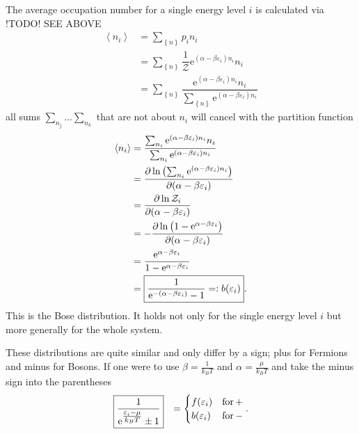 \documentclass[a4paper,10pt]{article}
\numberwithin{equation}{section}
\begin{document}
\begin{multicols}{2}
The average occupation number for a single energy level $i$ is calculated via !TODO! SEE ABOVE
\begin{align} 
  \left\langle n_i\right\rangle  &= \sum_{ \left\{n\right\}}^{}p_i n_i\\
                                 &= \sum_{ \left\{n\right\}}^{}\dfrac{1}{\mathcal{Z}}\text{e}^{(\alpha -\beta \varepsilon _i)n_i}n_i\\
                                 &= \sum_{ \left\{n\right\}}^{}\dfrac{\text{e}^{(\alpha -\beta \varepsilon _i)n_i}n_i}{\sum_{ \left\{n\right\}}^{}\text{e}^{(\alpha -\beta \varepsilon _i)n_i}}
\end{align} 
all sums $\sum_{n_j}^{}\hdots \sum_{n_k}^{}$ that are not about $n_i$ will cancel with the partition function
\begin{align} 
  \left\langle n_i\right\rangle  &= \dfrac{\sum_{n_i}^{}\text{e}^{(\alpha -\beta \varepsilon _i)n_i}n_i}{\sum_{n_i}^{}\text{e}^{(\alpha -\beta \varepsilon _i)n_i}}\\
                                 &= \diffp[]{\ln\left(\sum_{n_i}^{}\text{e}^{(\alpha -\beta \varepsilon _i)n_i}\right)}{(\alpha -\beta \varepsilon _i)}\\
                                 &= \diffp[]{\ln \mathcal{Z}_i}{(\alpha -\beta \varepsilon _i)}\\
                                 &= -\diffp[]{\ln \left(1-\text{e}^{\alpha -\beta \varepsilon _i}\right)}{(\alpha -\beta \varepsilon _i)}\\
                                 &= \dfrac{\text{e}^{\alpha -\beta \varepsilon _i}}{1-\text{e}^{\alpha -\beta \varepsilon _i}}\\
                                 &=\boxed{\dfrac{1}{\text{e}^{-(\alpha -\beta \varepsilon _i)}-1}=:b(\varepsilon _i)}
.\end{align} 
This is the Bose distribution.
It holds not only for the single energy level $i$ but more generally for the whole system.

These distributions are quite similar and only differ by a sign; plus for Fermions and minus for Bosons.
If one were to use $\beta =\tfrac{1}{k_BT}$ and $\alpha =\tfrac{\mu }{k_BT}$ and take the minus sign into the parentheses
\begin{align} 
  \Aboxed{\dfrac{1}{\text{e}^{\tfrac{\varepsilon _i-\mu }{k_BT}}\pm 1}} &= \begin{cases}
    f(\varepsilon _i)&\text{for}\,+\\ b(\varepsilon _i)&\text{for}\,-
  \end{cases}
.\end{align} 


\end{multicols}

%
%

\end{document}
